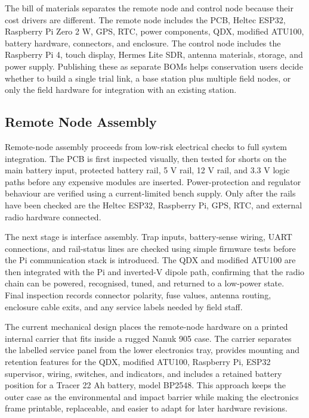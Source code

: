 \documentclass[acmsmall,screen]{acmart}
\begin{document}
The bill of materials separates the remote node and control node because their cost drivers are different. The remote node includes the PCB, Heltec ESP32, Raspberry Pi Zero 2 W, GPS, RTC, power components, QDX, modified ATU100, battery hardware, connectors, and enclosure. The control node includes the Raspberry Pi 4, touch display, Hermes Lite SDR, antenna materials, storage, and power supply. Publishing these as separate BOMs helps conservation users decide whether to build a single trial link, a base station plus multiple field nodes, or only the field hardware for integration with an existing station.

\subsection{Remote Node Assembly}
Remote-node assembly proceeds from low-risk electrical checks to full system integration. The PCB is first inspected visually, then tested for shorts on the main battery input, protected battery rail, 5 V rail, 12 V rail, and 3.3 V logic paths before any expensive modules are inserted. Power-protection and regulator behaviour are verified using a current-limited bench supply. Only after the rails have been checked are the Heltec ESP32, Raspberry Pi, GPS, RTC, and external radio hardware connected.

The next stage is interface assembly. Trap inputs, battery-sense wiring, UART connections, and rail-status lines are checked using simple firmware tests before the Pi communication stack is introduced. The QDX and modified ATU100 are then integrated with the Pi and inverted-V dipole path, confirming that the radio chain can be powered, recognised, tuned, and returned to a low-power state. Final inspection records connector polarity, fuse values, antenna routing, enclosure cable exits, and any service labels needed by field staff.

The current mechanical design places the remote-node hardware on a printed internal carrier that fits inside a rugged Nanuk 905 case. The carrier separates the labelled service panel from the lower electronics tray, provides mounting and retention features for the QDX, modified ATU100, Raspberry Pi, ESP32 supervisor, wiring, switches, and indicators, and includes a retained battery position for a Tracer 22 Ah battery, model BP2548. This approach keeps the outer case as the environmental and impact barrier while making the electronics frame printable, replaceable, and easier to adapt for later hardware revisions.
\end{document}
